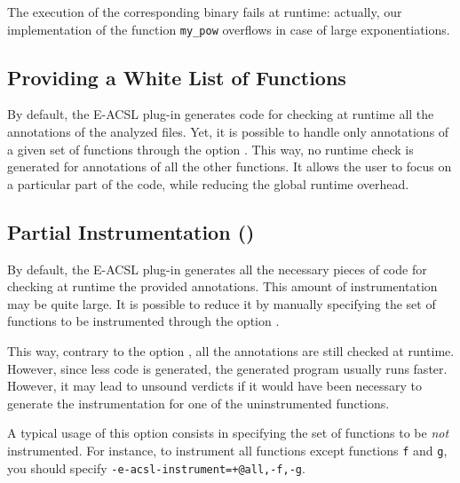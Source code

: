 The execution of the corresponding binary fails at runtime: actually, our
implementation of the function \texttt{my\_pow} overflows in case of large
exponentiations.


\subsection{Providing a White List of Functions}
\label{sec:white-list}

By default, the E-ACSL plug-in generates code for checking at runtime all the
annotations of the analyzed files. Yet, it is possible to handle only
annotations of a given set of functions through the option
. This way, no runtime check is generated for
annotations of all the other functions. It allows the user to focus on a
particular part of the code, while reducing the global runtime overhead.


\subsection{Partial Instrumentation (\experimentalword)}
\label{sec:partial-instrumentation}


By default, the E-ACSL plug-in generates all the necessary pieces of code for
checking at runtime the provided annotations. This amount of instrumentation
may be quite large. It is possible to reduce it by manually specifying the set
of functions to be instrumented through the option .

This way, contrary to the option , all the
annotations are still checked at runtime. However, since less code is generated,
the generated program usually runs faster. However, it may lead to unsound
verdicts if it would have been necessary to generate the instrumentation for one
of the uninstrumented functions.

A typical usage of this option consists in specifying the set of functions to be
\emph{not} instrumented. For instance, to instrument all functions except
functions \texttt{f} and \texttt{g}, you should specify
\texttt{-e-acsl-instrument=+@all,-f,-g}.

